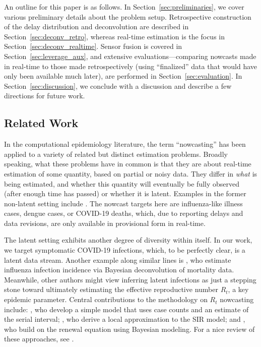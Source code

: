 \documentclass[sts]{imsart}
\theoremstyle{plain}
\theoremstyle{definition}
\theoremstyle{remark}
\begin{document}
An outline for this paper is as follows. In Section~\ref{sec:preliminaries}, we
cover various preliminary details about the problem setup. Retrospective
construction of the delay distribution and deconvolution are described in
Section~\ref{sec:deconv_retro}, whereas real-time estimation is the focus in
Section~\ref{sec:deconv_realtime}. Sensor fusion is covered in
Section~\ref{sec:leverage_aux}, and extensive evaluations---comparing nowcasts
made in real-time to those made retrospectively (using ``finalized'' data that
would have only been available much later), are performed in
Section~\ref{sec:evaluation}. In Section~\ref{sec:discussion}, we conclude with
a discussion and describe a few directions for future work.

\subsection{Related Work}
\label{sec:related_work}

In the computational epidemiology literature, the term ``nowcasting'' has been
applied to a variety of related but distinct estimation problems. Broadly
speaking, what these problems have in common is that they are about real-time
estimation of some quantity, based on partial or noisy data. They differ in
\emph{what} is being estimated, and whether this quantity will
eventually be fully observed (after enough time has passed) or whether it is 
latent. Examples in the former non-latent setting include \citet{Yang:2015,
  Farrow:2016, Jahja:2019, Brooks:2020, McGough:2020, Hawryluk:2021}. The
nowcast targets here are influenza-like illness cases, dengue cases, or
COVID-19 deaths, which, due to reporting delays and data revisions, are only 
available in provisional form in real-time. 

The latent setting exhibits another degree of diversity within itself. In our
work, we target symptomatic COVID-19 infections, which, to be perfectly clear,
is a latent data stream. Another example along similar lines is
\citet{Goldstein:2009}, who estimate influenza infection incidence via Bayesian
deconvolution of mortality data. Meanwhile, other authors might view inferring 
latent infections as just a stepping stone toward ultimately estimating the 
effective reproductive number $R_t$, a key epidemic parameter. Central
contributions to the methodology on $R_t$ nowcasting include:
\citet{Wallinga:2004}, who develop a simple model that uses case counts and an 
estimate of the serial interval; \citet{Bettencourt:2008}, who derive a local
approximation to the SIR model; and \citet{Cori:2013, Thompson:2019}, who build 
on the renewal equation using Bayesian modeling. For a nice review of these
approaches, see \citet{Gostic:2020}. 
\end{document}
